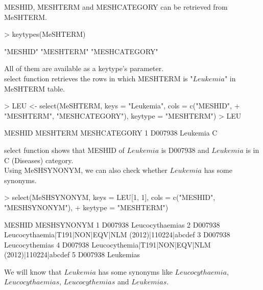 \documentclass[11pt]{article}
\begin{document}
MESHID, MESHTERM and MESHCATEGORY can be retrieved from MeSHTERM.
\begin{center}
\begin{Schunk}
\begin{Sinput}
> keytypes(MeSHTERM)
\end{Sinput}
\begin{Soutput}
[1] "MESHID"       "MESHTERM"     "MESHCATEGORY"
\end{Soutput}
\end{Schunk}
\end{center}
All of them are available as a keytype's parameter.\\


select function retrieves the rows in which MESHTERM is "$Leukemia$" in MeSHTERM table.
\begin{center}
\begin{Schunk}
\begin{Sinput}
> LEU <- select(MeSHTERM, keys = "Leukemia", cols = c("MESHID", 
+     "MESHTERM", "MESHCATEGORY"), keytype = "MESHTERM")
> LEU
\end{Sinput}
\begin{Soutput}
   MESHID MESHTERM MESHCATEGORY
1 D007938 Leukemia            C
\end{Soutput}
\end{Schunk}
\end{center}


select function shows that MESHID of $Leukemia$ is D007938 and $Leukemia$ is in C (Diseases) category.\\


Using MeSHSYNONYM, we can also check whether $Leukemia$ has some synonyms.
\begin{center}
\begin{Schunk}
\begin{Sinput}
> select(MeSHSYNONYM, keys = LEU[1, 1], cols = c("MESHID", "MESHSYNONYM"), 
+     keytype = "MESHTERM")
\end{Sinput}
\end{Schunk}
\end{center}
\begin{center}
\begin{Schunk}
\begin{Soutput}
MESHID MESHSYNONYM
1 D007938 Leucocythaemias
2 D007938 Leucocythaemia|T191|NON|EQV|NLM (2012)|110224|abcdef
3 D007938 Leucocythemias
4 D007938 Leucocythemia|T191|NON|EQV|NLM (2012)|110224|abcdef
5 D007938 Leukemias
\end{Soutput}
\end{Schunk}
\end{center}
We will know that $Leukemia$ has some synonyms like $Leucocythaemia$, $Leucocythaemias$, $Leucocythemias$ and $Leukemias$.\\\\
\end{document}
